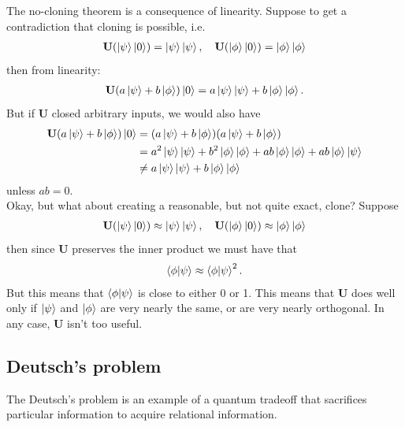 \documentclass{book}
\theoremstyle{definition}
\newcommand{\nn}{\nonumber}
\begin{document}
The no-cloning theorem is a consequence of linearity. Suppose to get a contradiction that cloning is possible, i.e. 
\begin{align}
\mathbf{U}(\ket{\psi}\ket{0}) = \ket{\psi}\ket{\psi}, \quad \mathbf{U}(\ket{\phi}\ket{0}) = \ket{\phi}\ket{\phi}
\end{align}
then from linearity:
\begin{align}
\mathbf{U}(a\ket{\psi} + b\ket{\phi})\ket{0} = a\ket{\psi}\ket{\psi} + b\ket{\phi}\ket{\phi}.
\end{align}
But if $\mathbf{U}$ closed arbitrary inputs, we would also have
\begin{align}
\mathbf{U}(a\ket{\psi} + b\ket{\phi})\ket{0} &= (a\ket{\psi} + b\ket{\phi})(a\ket{\psi} + b\ket{\phi})\nn\\
&= a^2\ket{\psi}\ket{\psi} + b^2\ket{\phi}\ket{\phi} + ab\ket{\phi}\ket{\phi} + ab\ket{\phi}\ket{\psi}\nn\\
&\neq a\ket{\psi}\ket{\psi} + b\ket{\phi}\ket{\phi}
\end{align}
unless $ab=0$. \\

Okay, but what about creating a reasonable, but not quite exact, clone? Suppose
\begin{align}
\mathbf{U}(\ket{\psi}\ket{0}) \approx \ket{\psi}\ket{\psi}, \quad \mathbf{U}(\ket{\phi}\ket{0}) \approx \ket{\phi}\ket{\phi}
\end{align}
then since $\mathbf{U}$ preserves the inner product we must have that
\begin{align}
\braket{\phi}{\psi} \approx \braket{\phi}{\psi}^2.
\end{align}
But this means that $\braket{\phi}{\psi}$ is close to either 0 or 1. This means that $\mathbf{U}$ does well only if $\ket{\psi}$ and $\ket{\phi}$ are very nearly the same, or are very nearly orthogonal. In any case, $\mathbf{U}$ isn't too useful. 








\subsection{Deutsch's problem}




The Deutsch's problem is an example of a quantum tradeoff that sacrifices particular information to acquire relational information.\\
\end{document}
